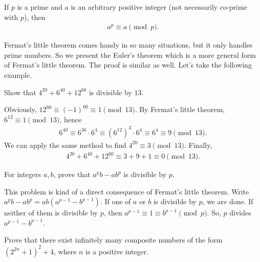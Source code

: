 \documentclass{subfile}
\begin{document}
		 \begin{corollary}
		 	If $p$ is a prime and $a$ is an arbitrary positive integer (not necessarily co-prime with $p$), then
		 	\begin{align*}
		 	a^p \equiv a \pmod p.
		 	\end{align*}
		 \end{corollary}	 
	Fermat's little theorem comes handy in so many situations, but it only handles prime numbers. So we present the Euler's theorem which is a more general form of Fermat's little theorem. The proof is similar as well. Let's take the following example.
	
		\begin{problem}
			Show that $4^{20} + 6^{40} + 12^{60}$ is divisible by $13$.
		\end{problem}
		
		\begin{solution}
			Obviously, $12^{60}\equiv (-1)^{60} \equiv 1 \pmod {13}$. By Fermat's little theorem, $6^{12} \equiv 1 \pmod{13}$, hence
				\begin{align*}
					6^{40} \equiv 6^{36} \cdot 6^4 \equiv \left(6^{12}\right)^3 \cdot 6^4 \equiv 6^4 \equiv 9 \pmod{13}.
				\end{align*}
			We can apply the same method to find $4^{20} \equiv 3 \pmod{13}$. Finally,
				\begin{align*}
					4^{20} + 6^{40} + 12^{60} \equiv 3+9+1 \equiv 0 \pmod{13}.
				\end{align*}
		\end{solution}
		
		\begin{problem}\label{e2}
			For integers $a,b$, prove that $a^pb-ab^p$ is divisible by $p$.
		\end{problem}
		
		\begin{solution}
			This problem is kind of a direct consequence of Fermat's little theorem. Write $a^pb-ab^p=ab(a^{p-1}-b^{p-1})$. If one of $a$ or $b$ is divisible by $p$, we are done. If neither of them is divisible by $p$, then $a^{p-1}\equiv1\equiv b^{p-1}\pmod p$. So, $p$ divides $a^{p-1}-b^{p-1}$.
		\end{solution}
		
		\begin{problem}
			Prove that there exist infinitely many composite numbers of the form $(2^{2n}+1 )^2+4$, where $n$ is a positive integer.
		\end{problem}
		
\end{document}
